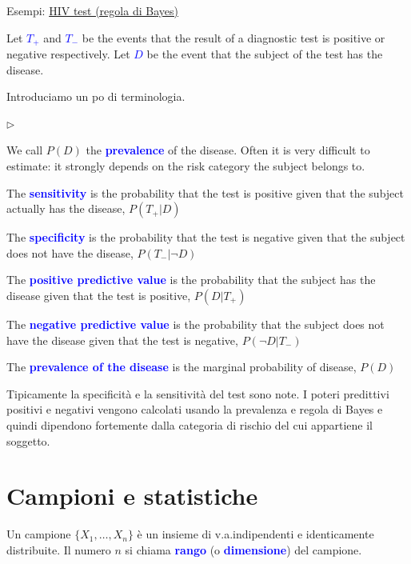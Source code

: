 \documentclass[12pt,openany]{book}
\newcommand{\mylabel}[1]{{\footnotesize\textsf{#1}}\hfill}
\renewenvironment{itemize}
  {\begin{list}{$\triangleright$}{%
   \setlength{\parskip}{0mm}
   \setlength{\topsep}{.2\baselineskip}
   \setlength{\rightmargin}{0mm}
   \setlength{\listparindent}{0mm}
   \setlength{\itemindent}{0mm}
   \setlength{\labelwidth}{3ex}
   \setlength{\itemsep}{.4\baselineskip}
   \setlength{\parsep}{0mm}
   \setlength{\partopsep}{0mm}
   \setlength{\labelsep}{1ex}
   \setlength{\leftmargin}{\labelwidth+\labelsep}
   \let\makelabel\mylabel}}{%
   \end{list}\vspace*{-1.3mm}}
\def\emph#1{\textcolor{blue}{\textbf{\boldmath #1}}}
\theoremstyle{mio}
\theoremstyle{liscio}
\begin{document}
{\color{brown}Esempi:}  \hyperref[HIV_test]{HIV test (regola di Bayes) \faShare}

Let \emph{$T_+$\/} and \emph{$T_-$\/} be the events that the result of a diagnostic test
is positive or negative respectively. Let \emph{$D$\/} be the event that the subject of the test has the disease. 

Introduciamo un po di terminologia.

\begin{itemize}
\item We call $P(D)$ the \emph{prevalence\/} of the disease. Often it is very difficult to estimate: it strongly depends on the risk category the subject belongs to.
\item The \emph{sensitivity\/} is the probability that the test is
positive given that the subject actually has the disease, $P(T_+ | D)$
\item The \emph{specificity\/} is the probability that the test is
negative given that the subject does not have the disease, $P(T_- | \neg D)$
\item The \emph{positive predictive value\/} is the probability that the subject has the
disease given that the test is positive, $P(D | T_+)$
\item The \emph{negative predictive value\/} is the probability that the subject does not have
the disease given that the test is negative, $P(\neg D | T_-)$
\item The \emph{prevalence of the disease\/} is the marginal probability of disease, $P(D)$

\end{itemize}


Tipicamente la specificità e la sensitività del test sono note. I poteri predittivi positivi e negativi vengono calcolati usando la prevalenza e regola di Bayes e quindi dipendono fortemente dalla categoria di rischio del cui appartiene il soggetto.





\clearpage\section{Campioni e statistiche}

Un campione $\{X_1,\dots,X_n\}$ è un insieme di v.a.\@ indipendenti e identicamente distribuite. Il numero $n$ si chiama \emph{rango\/} (o \emph{dimensione\/}) del campione. 
\end{document}
